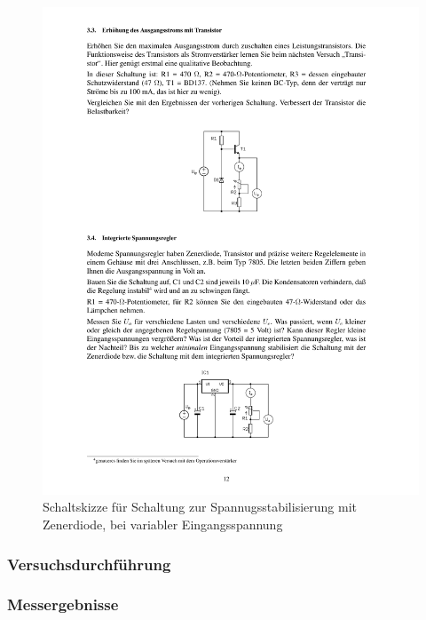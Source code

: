 \documentclass[12pt,a4paper]{article}
\begin{document}
\begin{figure}[H] 
  \centering
    \includegraphics[trim = 10mm 160mm 10mm 70mm, clip, scale = 1]{ep2_14[Page12].pdf}
  	\caption[Schaltskizze für Schaltung zur Spannugsstabilisierung mit Zenerdiode, bei variabler Eingangsspannung]{Schaltskizze für Schaltung zur Spannugsstabilisierung mit Zenerdiode, bei variabler Eingangsspannung\footnotemark}
  \label{fig:2_10}
\end{figure}

\subsubsection{Versuchsdurchführung}

\subsubsection{Messergebnisse}
\end{document}
